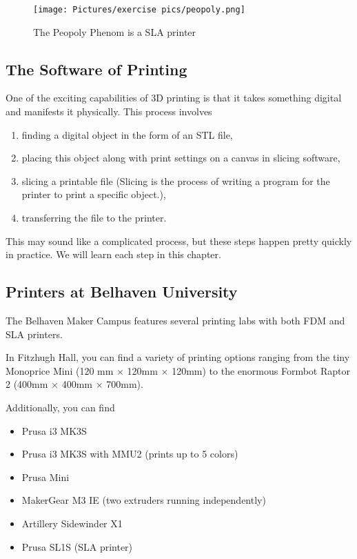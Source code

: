 \begin{figure}[h]
    \centering
    \texttt{[image: Pictures/exercise pics/peopoly.png]}
    \caption{The Peopoly Phenom is a SLA printer}
    \label{fig:prusai3}
\end{figure}

\subsection{The Software of Printing}

One of the exciting capabilities of 3D printing is that it takes something digital and manifests it physically. This process involves 
\begin{enumerate}
    \item finding a digital object in the form of an STL file,
    \item placing this object along with print settings on a canvas in slicing software,
    \item slicing a printable file (Slicing is the process of writing a program for the printer to print a specific object.),
    \item transferring the file to the printer.
\end{enumerate}

\noindent This may sound like a complicated process, but these steps happen pretty quickly in practice. We will learn each step in this chapter.

\subsection{Printers at Belhaven University}

The Belhaven Maker Campus features several printing labs with both FDM and SLA printers. 

\noindent In Fitzhugh Hall, you can find a variety of printing options ranging from the tiny Monoprice Mini (120 mm $\times$ 120mm $\times$ 120mm) to the enormous Formbot Raptor 2 (400mm $\times$ 400mm $\times$ 700mm).

Additionally, you can find
\begin{itemize}
    \item Prusa i3 MK3S 
    \item Prusa i3 MK3S with MMU2 (prints up to 5 colors)
    \item Prusa Mini
    \item MakerGear M3 IE (two extruders running independently)
    \item Artillery Sidewinder X1
    \item Prusa SL1S (SLA printer)
\end{itemize}


